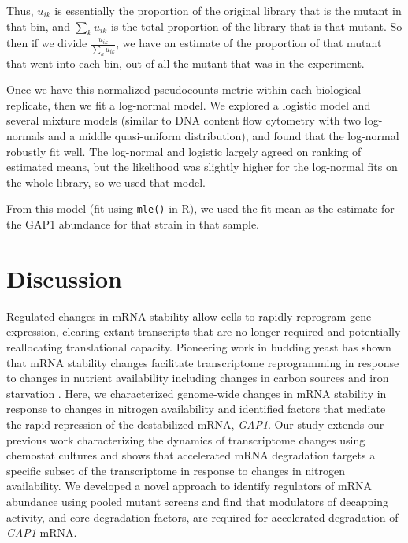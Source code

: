 Thus, \(u_{ik}\) is essentially the proportion of the
original library that is the mutant in that bin, and 
\(\sum_k u_{ik}\) is the total proportion of the library that is
that mutant.
So then if we divide \(\frac{u_{ik}}{\sum_k u_{ik}}\),
we have an estimate of the proportion of that mutant that
went into each bin, out of all the mutant that was in the experiment.

Once we have this normalized pseudocounts metric within each biological
replicate, then we fit a log-normal model. We explored a logistic model
and several mixture models (similar to DNA content flow cytometry with
two log-normals and a middle quasi-uniform distribution), and found that
the log-normal robustly fit well. The log-normal and logistic largely
agreed on ranking of estimated means, but the likelihood was slightly
higher for the log-normal fits on the whole library, so we used that
model.

From this model (fit using \texttt{mle()} in R), we used the fit 
mean as the estimate for the GAP1 abundance for that strain in that
sample.

\section{Discussion}

Regulated changes in mRNA stability allow cells to rapidly reprogram
gene expression, clearing extant transcripts that are no longer
required and potentially reallocating translational capacity.
Pioneering work in budding yeast has shown that mRNA
stability changes facilitate transcriptome reprogramming in response to
changes in nutrient availability including changes in carbon sources
\parencite{scheffler1998control} and iron starvation
\parencite{puig2005coordinated}. 
Here, we characterized genome-wide changes
in mRNA stability in response to changes in nitrogen availability and
identified factors that mediate the rapid repression of the
destabilized mRNA, \textit{GAP1}. Our study extends our previous work
characterizing the dynamics of transcriptome changes using chemostat
cultures \parencite{airoldi2016steady} and shows that accelerated mRNA
degradation targets a specific subset of the transcriptome in response
to changes in nitrogen availability. We developed a novel approach to
identify regulators of mRNA abundance using pooled mutant screens and
find that modulators of decapping activity, and core degradation
factors, are required for accelerated degradation of 
\textit{GAP1} mRNA. 
 
